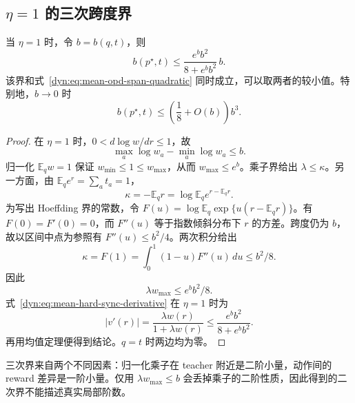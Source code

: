 \documentclass[lang=cn,scheme=chinese,openany]{../book/elegantbook}
\newcommand{\E}{\mathbb E}
\begin{document}
\subsection{\texorpdfstring{$\eta=1$}{eta=1} 的三次跨度界}
\label{dyn:sec:mean-hard-sync-cubic-span}

\begin{proposition}
\label{dyn:prop:mean-hard-sync-cubic-span}
当 $\eta=1$ 时，令 $b=b(q,t)$，则
\begin{equation}
 b(p^\star,t)
 \le\frac{e^b b^2}{8+e^b b^2}\,b.
 \label{dyn:eq:mean-hard-sync-cubic-span}
\end{equation}
该界和式~\eqref{dyn:eq:mean-opd-span-quadratic} 同时成立，可以取两者的较小值。特别地，$b\to0$ 时
\begin{equation*}
 b(p^\star,t)\le\left(\frac18+O(b)\right)b^3.
\end{equation*}
\end{proposition}

\begin{proof}
在 $\eta=1$ 时，$0<d\log w/dr\le1$，故
\begin{equation*}
 \max_a\log w_a-\min_a\log w_a\le b.
\end{equation*}
归一化 $\E_qw=1$ 保证 $w_{\min}\le1\le w_{\max}$，从而 $w_{\max}\le e^b$。乘子界给出 $\lambda\le\kappa$。另一方面，由 $\E_qe^r=\sum_at_a=1$，
\begin{equation*}
 \kappa=-\E_qr
 =\log\E_qe^{r-\E_qr}.
\end{equation*}
为写出 Hoeffding 界的常数，令 $F(u)=\log\E_q\exp\{u(r-\E_qr)\}$。有 $F(0)=F'(0)=0$，而 $F''(u)$ 等于指数倾斜分布下 $r$ 的方差。跨度仍为 $b$，故以区间中点为参照有 $F''(u)\le b^2/4$。两次积分给出
\begin{equation*}
 \kappa=F(1)=\int_0^1(1-u)F''(u)\,du\le b^2/8.
\end{equation*}
因此
\begin{equation*}
 \lambda w_{\max}\le e^b b^2/8.
\end{equation*}
式~\eqref{dyn:eq:mean-hard-sync-derivative} 在 $\eta=1$ 时为
\begin{equation*}
 |v'(r)|=\frac{\lambda w(r)}{1+\lambda w(r)}
 \le\frac{e^b b^2}{8+e^b b^2}.
\end{equation*}
再用均值定理便得到结论。$q=t$ 时两边均为零。
\end{proof}

三次界来自两个不同因素：归一化乘子在 teacher 附近是二阶小量，动作间的 reward 差异是一阶小量。仅用 $\lambda w_{\max}\le b$ 会丢掉乘子的二阶性质，因此得到的二次界不能描述真实局部阶数。
\end{document}
